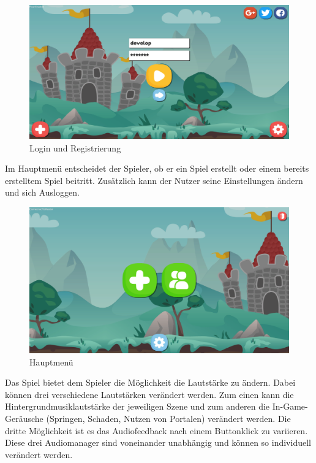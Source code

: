 \begin{figure}[H]
    \begin{center}
      \includegraphics[width=\linewidth]{img/realisierung/Login}
      \caption{Login und Registrierung}
      \label{fig:realisierung:realisierung:login}
    \end{center}
\end{figure}

Im Hauptmenü entscheidet der Spieler, ob er ein Spiel erstellt oder einem bereits erstelltem Spiel beitritt. Zusätzlich kann der Nutzer seine Einstellungen ändern und sich Ausloggen.

\begin{figure}[H]
    \begin{center}
      \includegraphics[width=\linewidth]{img/realisierung/menu}
      \caption{Hauptmenü}
      \label{fig:realisierung:realisierung:hauptmenu}
    \end{center}
\end{figure}

Das Spiel bietet dem Spieler die Möglichkeit die Lautstärke zu ändern. Dabei können drei verschiedene Lautstärken verändert werden. Zum einen kann die Hintergrundmusiklautstärke der jeweiligen Szene und zum anderen die In-Game-Geräusche (Springen, Schaden, Nutzen von Portalen) verändert werden. Die dritte Möglichkeit ist es das Audiofeedback nach einem Buttonklick zu variieren. Diese drei Audiomanager sind voneinander unabhängig und können so individuell verändert werden.

